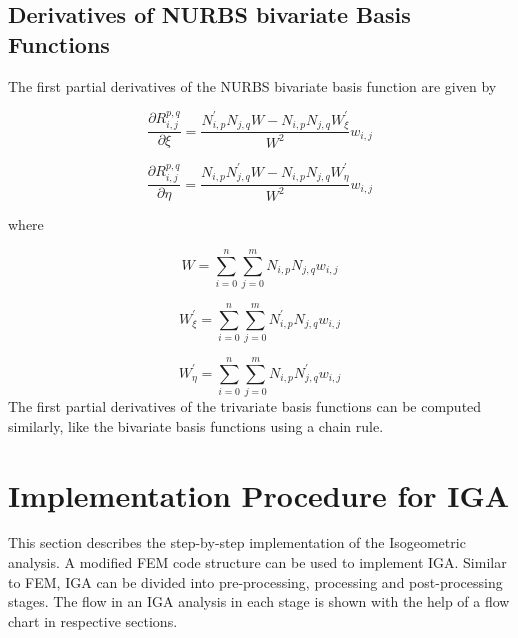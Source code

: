 \documentclass[11pt]{article}
\begin{document}
\subsection{Derivatives of NURBS bivariate Basis Functions}
The first partial derivatives of the NURBS bivariate basis function are given by \cite{nguyen2012introduction}

\begin{equation}
\frac{\partial R_{i,j}^{p,q}}{\partial \xi} = \frac{N^{'}_{i,p} N_{j,q} W -
	N_{i,p} N_{j,q} W^{'}_{\xi}}{W^2}w_{i,j}
\end{equation}

\begin{equation}
\frac{\partial R_{i,j}^{p,q}}{\partial \eta} = \frac{N_{i,p} N^{'}_{j,q} W -
	N_{i,p} N_{j,q} W^{'}_{\eta}}{W^2}w_{i,j}
\end{equation}

\noindent
where

\begin{equation}
W = \sum_{i=0}^{n}\sum_{j=0}^{m}N_{i,p} N_{j,q}w_{i,j}
\end{equation}

\begin{equation}
W^{'}_{\xi} = \sum_{i=0}^{n}\sum_{j=0}^{m}N^{'}_{i,p} N_{j,q}w_{i,j}
\end{equation}

\begin{equation}
W^{'}_{\eta} = \sum_{i=0}^{n}\sum_{j=0}^{m}N_{i,p} N^{'}_{j,q}w_{i,j}
\end{equation}
The first partial derivatives of the trivariate basis functions can be computed similarly, like the bivariate basis functions using a chain rule.


\newpage
\section{Implementation Procedure for IGA}
This section describes the step-by-step implementation of the Isogeometric analysis. A modified FEM code structure can be used to implement IGA. Similar to FEM, IGA can be divided into pre-processing, processing and post-processing stages. The flow in an IGA analysis in each stage is shown with the help of a flow chart in respective sections.
\end{document}
